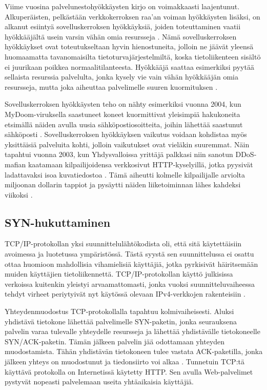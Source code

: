 Viime vuosina palvelunestohyökkäysten kirjo on voimakkaasti
laajentunut. Alkuperäisten, pelkästään verkkokerroksen raa’an voiman
hyökkäysten lisäksi, on alkanut esiintyä sovelluskerroksen
hyökkäyksiä, joiden toteuttaminen vaatii hyökkääjältä usein varsin
vähän omia resursseja \cite{Hacking}. Nämä sovelluskerroksen
hyökkäykset ovat toteutukseltaan hyvin hienostuneita, jolloin ne
jäävät yleensä huomaamatta tavanomaisilta tietoturvajärjestelmiltä,
koska tietoliikenteen sisältö ei juurikaan poikkea
normaalitilanteesta. Hyökkääjä saattaa esimerkiksi pyytää sellaista
resurssia palvelulta, jonka kysely vie vain vähän hyökkääjän omia
resursseja, mutta joka aiheuttaa palvelimelle suuren kuormituksen
\cite{DDOSb}.

Sovelluskerroksen hyökkäysten teho on nähty esimerkiksi vuonna 2004, kun
MyDoom-\-viruksella saastuneet koneet kuormittivat yleisimpiä
hakukoneita etsimällä näiden avulla uusia sähköpostiosoitteita, joihin
lähettää saastunut sähköposti \cite{Hacking}. Sovelluskerroksen
hyökkäyksen vaikutus voidaan kohdistaa myös yksittäisiä palveluita
kohti, jolloin vaikutukset ovat vieläkin suuremmat. Näin tapahtui
vuonna 2003, kun Yhdysvalloissa yrittäjä palkkasi niin sanotun DDoS-mafian
kaatamaan kilpailijoidensa verkkosivut HTTP-kyselyillä, jotka pyysivät
ladattavaksi isoa kuvatiedostoa \cite{DDOSb}. Tämä aiheutti kolmelle
kilpailijalle arviolta miljoonan dollarin tappiot ja pysäytti
näiden liiketoiminnan lähes kahdeksi viikoksi \cite{FBI}.

\subsection{SYN-hukuttaminen}
TCP/IP-protokollan yksi suunnittelulähtökodista oli, että sitä
käytettäisiin avoimessa ja luotetussa ympäristössä. Tästä syystä sen
suunnittelussa ei osattu ottaa huomioon mahdollisia vihamielisiä
käyttäjiä, jotka pyrkisivät häiritsemään muiden käyttäjien
tietoliikennettä. TCP/IP-protokollan käyttö julkisissa verkoissa kuitenkin
yleistyi arvaamattomasti, jonka vuoksi suunnitteluvaiheessa tehdyt
virheet periytyivät nyt käytössä olevaan IPv4-verkkojen rakenteisiin
\cite{Hacking}.

Yhteydenmuodostus TCP-protokollalla tapahtuu kolmivaiheisesti. Aluksi
yhdistävä tietokone lähettää palvelimelle SYN-paketin, jonka
seurauksena palvelin varaa tulevalle yhteydelle resursseja ja lähettää
yhdistävälle tietokoneelle SYN/ACK-paketin. Tämän jälkeen palvelin
jää odottamaan yhteyden muodostamista. Tähän yhdistävän tietokoneen
tulee vastata ACK-paketilla, jonka jälkeen yhteys on muodostunut ja
tiedonsiirto voi alkaa \cite{Hacking}. Tunnetuin TCP:tä käyttävä
protokolla on Internetissä käytetty HTTP. Sen avulla Web-palvelimet
pystyvät nopeasti palvelemaan useita yhtäaikaisia käyttäjiä.

